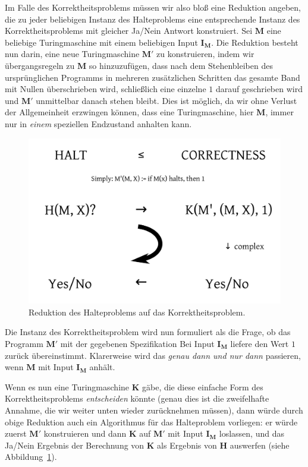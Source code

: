Im Falle des Korrektheitsproblems müssen wir also bloß eine Reduktion angeben, die zu jeder beliebigen Instanz des Halteproblems eine entsprechende Instanz des Korrektheits\-problems mit gleicher Ja/Nein Antwort konstruiert. Sei $\mathbf{M}$ eine beliebige Turingmaschine mit einem beliebigen Input $\mathbf{I_M}$. Die Reduktion besteht nun darin, eine neue Turingmaschine $\mathbf{M'}$ zu konstruieren, indem wir übergangsregeln zu $\mathbf{M}$ so hinzuzufügen, dass nach dem Stehenbleiben des ursprünglichen Programms in mehreren zusätzlichen Schritten das gesamte Band mit Nullen überschrieben wird, schließlich eine einzelne $1$ darauf geschrieben wird und $\mathbf{M'}$ unmittelbar danach stehen bleibt. Dies ist möglich, da wir ohne Verlust der Allgemeinheit erzwingen können, dass eine Turingmaschine, hier $\mathbf{M}$, immer nur in \emph{einem} speziellen Endzustand anhalten kann.

\begin{figure}[h]
\centering
\includegraphics[width=12cm]{img/correctnessproblem}
\caption{Reduktion des Halteproblems auf das Korrektheitsproblem.}
\label{fig:correctnessproblem}
\end{figure}

Die Instanz des Korrektheitsproblem wird nun formuliert als die Frage, ob das Programm $\mathbf{M'}$ mit der gegebenen Spezifikation \glqq{}Bei Input $\mathbf{I_M}$ liefere den Wert $1$ zurück\grqq{} übereinstimmt. Klarerweise wird das \emph{genau dann und nur dann} passieren, wenn $\mathbf{M}$ mit Input $\mathbf{I_M}$ anhält.

Wenn es nun eine Turingmaschine $\mathbf{K}$ gäbe, die diese einfache Form des Korrektheitspro\-blems \emph{entscheiden} könnte (genau dies ist die zweifelhafte Annahme, die wir weiter unten wieder zurücknehmen müssen), dann würde durch obige Reduktion auch ein Algorithmus für das Halteproblem vorliegen: er würde zuerst $\mathbf{M'}$ konstruieren und dann $\mathbf{K}$ auf $\mathbf{M'}$ mit Input $\mathbf{I_M}$ loslassen, und das Ja/Nein Ergebnis der Berechnung von $\mathbf{K}$ als Ergebnis von $\mathbf{H}$ auswerfen (siehe Abbildung~\ref{fig:correctnessproblem}).

